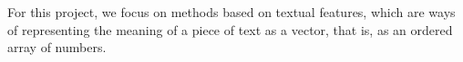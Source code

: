\label{02_feature_based_text_classification}

For this project, we focus on \textclassification{} methods based on textual features, which are ways of representing the meaning of a piece of text as a vector, that is, as an ordered array of numbers.

